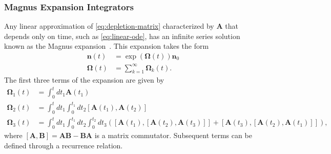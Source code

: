 \documentclass[3p,authoryear]{elsarticle}
\newcommand{\vect}[1]{\mathbf{#1}} %
\begin{document}
\subsubsection{Magnus Expansion Integrators}

Any linear approximation of \cref{eq:depletion-matrix} characterized by
$\vect{A}$ that depends only on time, such as \cref{eq:linear-ode}, has an
infinite series solution known as the Magnus expansion~\citep{blanes2009pr}.
This expansion takes the form
\begin{equation}
  \begin{split}
  \vect{n}(t) &= \exp \left( \vect{\Omega}(t) \right ) \vect{n}_0 \\
  \vect{\Omega}(t) &= \sum\limits_{k=1}^\infty \vect{\Omega}_k(t).
  \end{split}
\end{equation}
The first three terms of the expansion are given by
\begin{equation}
  \label{eq:magnus-terms}
  \begin{split}
    \vect{\Omega}_1(t) &= \int_0^t dt_1 \vect{A}(t_1) \\
    \vect{\Omega}_2(t) &= \int_0^t dt_1 \int_0^{t_1} dt_2 [\vect{A}(t_1), \vect{A}(t_2) ] \\
    \vect{\Omega}_3(t) &= \int_0^t dt_1 \int_0^{t_1} dt_2 \int_0^{t_2} dt_3
      \left ( [\vect{A}(t_1), [\vect{A}(t_2), \vect{A}(t_3)]] + [\vect{A}(t_3), [\vect{A}(t_2), \vect{A}(t_1)]] \right ),
  \end{split}
\end{equation}
where $[\vect{A},\vect{B}] = \vect{A}\vect{B} - \vect{B}\vect{A}$ is a matrix
commutator. Subsequent terms can be defined through a recurrence relation.
\end{document}
